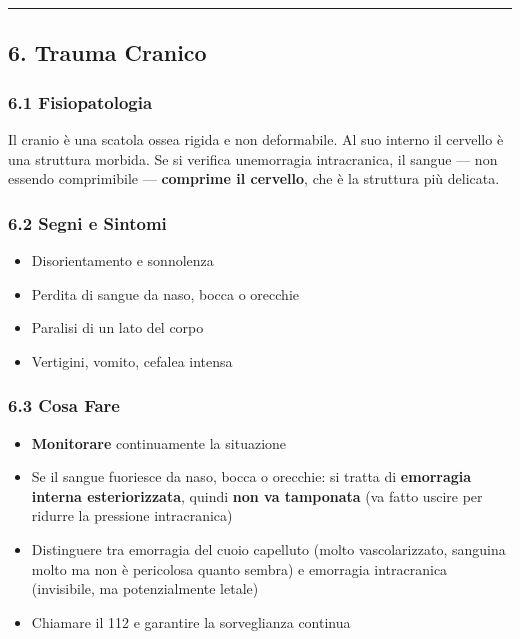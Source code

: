 \documentclass[a4paper,11pt]{article}
\providecommand{\tightlist}{%
  \setlength{\itemsep}{0pt}\setlength{\parskip}{0pt}}
\begin{document}
\begin{center}\rule{0.5\linewidth}{0.5pt}\end{center}

\subsection{6. Trauma Cranico}\label{trauma-cranico}

\subsubsection{6.1 Fisiopatologia}\label{fisiopatologia}

Il cranio è una scatola ossea rigida e non deformabile. Al suo interno
il cervello è una struttura morbida. Se si verifica
un\textquotesingle emorragia intracranica, il sangue --- non essendo
comprimibile --- \textbf{comprime il cervello}, che è la struttura più
delicata.

\subsubsection{6.2 Segni e Sintomi}\label{segni-e-sintomi}

\begin{itemize}
      \tightlist
      \item
            Disorientamento e sonnolenza
      \item
            Perdita di sangue da naso, bocca o orecchie
      \item
            Paralisi di un lato del corpo
      \item
            Vertigini, vomito, cefalea intensa
\end{itemize}

\subsubsection{6.3 Cosa Fare}\label{cosa-fare}

\begin{itemize}
      \tightlist
      \item
            \textbf{Monitorare} continuamente la situazione
      \item
            Se il sangue fuoriesce da naso, bocca o orecchie: si tratta di
            \textbf{emorragia interna esteriorizzata}, quindi \textbf{non va
                  tamponata} (va fatto uscire per ridurre la pressione intracranica)
      \item
            Distinguere tra emorragia del cuoio capelluto (molto vascolarizzato,
            sanguina molto ma non è pericolosa quanto sembra) e emorragia
            intracranica (invisibile, ma potenzialmente letale)
      \item
            Chiamare il 112 e garantire la sorveglianza continua
\end{itemize}
\end{document}
